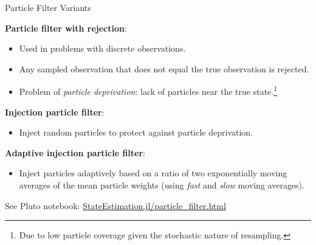 \begin{frame}[fragile]{Particle Filter Variants}

\textbf{Particle filter with rejection}:
\begin{itemize}
    \item Used in problems with discrete observations.
    \item Any sampled observation that does not equal the true observation is rejected.
    \item Problem of \textit{particle deprivation}: lack of particles near the true state.\footnote{Due to low particle coverage given the stochastic nature of resampling.}
\end{itemize}

\vspace{5mm}
\textbf{Injection particle filter}:
\begin{itemize}
    \item Inject random particles to protect against particle deprivation.
\end{itemize}

\vspace{5mm}
\textbf{Adaptive injection particle filter}:
\begin{itemize}
    \item Inject particles adaptively based on a ratio of two exponentially moving averages of the mean particle weights (using \textit{fast} and \textit{slow} moving averages).
\end{itemize}

\vspace{2mm}
See Pluto notebook: \href{http://htmlpreview.github.io/?https://raw.githubusercontent.com/mossr/StateEstimation.jl/master/html/particle_filter.html}{\color{cardinal}StateEstimation.jl/particle\_filter.html}

\end{frame}